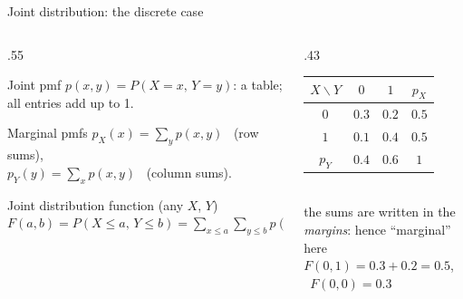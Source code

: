 \documentclass[aspectratio=169,11pt,usepdftitle=false]{beamer}
\begin{document}
\begin{frame}{Joint distribution: the discrete case}
  \small
  \begin{columns}[T]
    \begin{column}{.55\textwidth}
      \begin{block}{Joint pmf}
        $p(x,y)=P(X=x,\,Y=y)$: a table; all entries add up to 1.
      \end{block}
      \begin{block}{Marginal pmfs}
        $p_X(x)=\sum_y p(x,y)$ \ (row sums),\\[2pt]
        $p_Y(y)=\sum_x p(x,y)$ \ (column sums).
      \end{block}
      \begin{block}{Joint distribution function (any $X$, $Y$)}
        $F(a,b)=P(X\le a,\,Y\le b)=\displaystyle\sum_{x\le a}\sum_{y\le b}
        p(x,y)$
      \end{block}
    \end{column}
    \begin{column}{.43\textwidth}
      \centering
      \renewcommand{\arraystretch}{1.25}
      \begin{tabular}{c|cc|c}
        $X\backslash Y$ & $0$ & $1$ & $p_X$\\\hline
        $0$ & $0.3$ & $0.2$ & \alert{$0.5$}\\
        $1$ & $0.1$ & $0.4$ & \alert{$0.5$}\\\hline
        $p_Y$ & \alert{$0.4$} & \alert{$0.6$} & $1$
      \end{tabular}\\[2mm]
      \footnotesize the sums are written in the \emph{margins}: hence
      ``marginal''\\[1mm]
      here $F(0,1)=0.3+0.2=0.5$, \ $F(0,0)=0.3$
    \end{column}
  \end{columns}
\end{frame}

\end{document}

